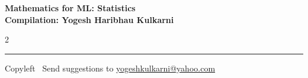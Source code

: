 \documentclass[8pt,landscape]{article}
\begin{document}
\footnotesize


\begin{center}
\Large{\textbf{Mathematics for ML: Statistics\\ Compilation: Yogesh Haribhau Kulkarni}}
\end{center}

\begin{multicols}{2}

\end{multicols}

\rule{\linewidth}{0.25pt}
\scriptsize
Copyleft \textcopyleft\  Send suggestions to
\href{http://www.yogeshkulkarni.com}{yogeshkulkarni@yahoo.com}
\end{document}
